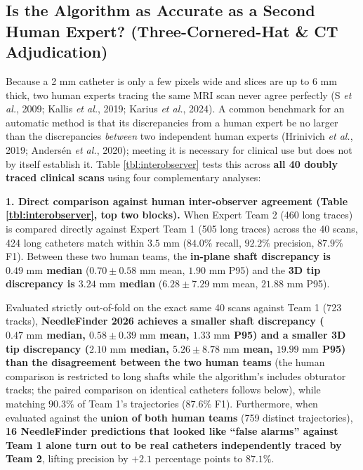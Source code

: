 \documentclass[
  11pt,
]{article}
\begin{document}
\FloatBarrier

\subsection{Is the Algorithm as Accurate as a Second Human Expert?
(Three-Cornered-Hat \& CT
Adjudication)}\label{is-the-algorithm-as-accurate-as-a-second-human-expert-three-cornered-hat-ct-adjudication}



Because a 2 mm catheter is only a few pixels wide and slices are up to 6
mm thick, two human experts tracing the same MRI scan never agree
perfectly (S \emph{et al.}, 2009; Kallis \emph{et al.}, 2019; Karius
\emph{et al.}, 2024). A common benchmark for an automatic method is that
its discrepancies from a human expert be no larger than the
discrepancies \emph{between} two independent human experts (Hrinivich
\emph{et al.}, 2019; Andersén \emph{et al.}, 2020); meeting it is
necessary for clinical use but does not by itself establish it. Table
\ref{tbl:interobserver} tests this across \textbf{all 40 doubly traced
clinical scans} using four complementary analyses:

\textbf{1. Direct comparison against human inter-observer agreement
(Table \ref{tbl:interobserver}, top two blocks).} When Expert Team 2
(460 long traces) is compared directly against Expert Team 1 (505 long
traces) across the 40 scans, 424 long catheters match within
\(3.5\text{ mm}\) (\(84.0\%\) recall, \(92.2\%\) precision, \(87.9\%\)
F1). Between these two human teams, the \textbf{in-plane shaft
discrepancy is \(0.49\text{ mm}\) median} (\(0.70 \pm 0.58\text{ mm}\)
mean, \(1.90\text{ mm}\) P95) and the \textbf{3D tip discrepancy is
\(3.24\text{ mm}\) median} (\(6.28 \pm 7.29\text{ mm}\) mean,
\(21.88\text{ mm}\) P95).

Evaluated strictly out-of-fold on the exact same 40 scans against Team 1
(723 tracks), \textbf{NeedleFinder 2026 achieves a smaller shaft
discrepancy (\(0.47\text{ mm}\) median, \(0.58 \pm 0.39\text{ mm}\)
mean, \(1.33\text{ mm}\) P95) and a smaller 3D tip discrepancy
(\(2.10\text{ mm}\) median, \(5.26 \pm 8.78\text{ mm}\) mean,
\(19.99\text{ mm}\) P95) than the disagreement between the two human
teams} (the human comparison is restricted to long shafts while the
algorithm's includes obturator tracks; the paired comparison on
identical catheters follows below), while matching \(90.3\%\) of Team
1's trajectories (\(87.6\%\) F1). Furthermore, when evaluated against
the \textbf{union of both human teams} (759 distinct trajectories),
\textbf{16 NeedleFinder predictions that looked like ``false alarms''
against Team 1 alone turn out to be real catheters independently traced
by Team 2}, lifting precision by \(+2.1\) percentage points to
\(87.1\%\).
\end{document}
